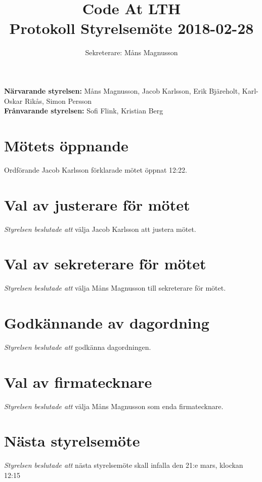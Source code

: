 \documentclass{article}
\begin{document}
\title{
    \Huge{Code At LTH} \\
Protokoll Styrelsemöte 2018-02-28 }
\author{ Sekreterare: Måns Magnusson}
\date{}
\maketitle
\thispagestyle{first}

{\bf Närvarande styrelsen:} Måns Magnusson, Jacob Karlsson, Erik Bjäreholt, Karl-Oskar Rikås, Simon Persson \\
{\bf Frånvarande styrelsen:} Sofi Flink, Kristian Berg\\

\section{Mötets öppnande}
Ordförande Jacob Karlsson förklarade mötet öppnat 12:22.

\section{Val av justerare för mötet} 

\emph{Styrelsen beslutade att} välja Jacob Karlsson att justera mötet. 

\section{Val av sekreterare för mötet} 

\emph{Styrelsen beslutade att} välja Måns Magnusson till sekreterare för mötet. 

\section{Godkännande av dagordning}

\emph{Styrelsen beslutade att} godkänna dagordningen.

\newpage
\section{Val av firmatecknare}
\emph{Styrelsen beslutade att} välja Måns Magnusson som enda firmatecknare.

\section{Nästa styrelsemöte}
\emph{Styrelsen beslutade att} nästa styrelsemöte skall infalla den 21:e mars, klockan 12:15
\end{document}
